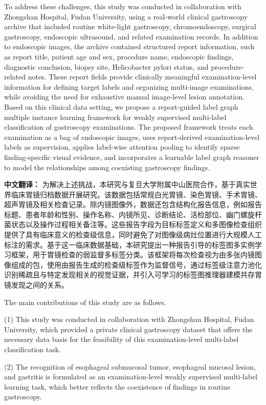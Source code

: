 \documentclass[Afour,sagev,times]{sagej}
\begin{document}
To address these challenges, this study was conducted in collaboration with Zhongshan Hospital, Fudan University, using a real-world clinical gastroscopy archive that included routine white-light gastroscopy, chromoendoscopy, surgical gastroscopy, endoscopic ultrasound, and related examination records. In addition to endoscopic images, the archive contained structured report information, such as report title, patient age and sex, procedure name, endoscopic findings, diagnostic conclusion, biopsy site, Helicobacter pylori status, and procedure-related notes. These report fields provide clinically meaningful examination-level information for defining target labels and organizing multi-image examinations, while avoiding the need for exhaustive manual image-level lesion annotation. Based on this clinical data setting, we propose a report-guided label graph multiple instance learning framework for weakly supervised multi-label classification of gastroscopy examinations. The proposed framework treats each examination as a bag of endoscopic images, uses report-derived examination-level labels as supervision, applies label-wise attention pooling to identify sparse finding-specific visual evidence, and incorporates a learnable label graph reasoner to model the relationships among coexisting gastroscopy findings.

\textbf{中文翻译：} 为解决上述挑战，本研究与复旦大学附属中山医院合作，基于真实世界临床胃镜归档数据开展研究。该数据包括常规白光胃镜、染色胃镜、手术胃镜、超声胃镜及相关检查记录。除内镜图像外，数据还包含结构化报告信息，例如报告标题、患者年龄和性别、操作名称、内镜所见、诊断结论、活检部位、幽门螺旋杆菌状态以及操作过程相关备注等。这些报告字段为目标标签定义和多图像检查组织提供了具有临床意义的检查级信息，同时避免了对图像级病灶位置进行大规模人工标注的需求。基于这一临床数据基础，本研究提出一种报告引导的标签图多实例学习框架，用于胃镜检查的弱监督多标签分类。该框架将每次检查视为由多张内镜图像组成的包，使用由报告生成的检查级标签作为监督信号，通过标签级注意力池化识别稀疏且与特定发现相关的视觉证据，并引入可学习的标签图推理器建模共存胃镜发现之间的关系。

The main contributions of this study are as follows.

(1) This study was conducted in collaboration with Zhongshan Hospital, Fudan University, which provided a private clinical gastroscopy dataset that offers the necessary data basis for the feasibility of this examination-level multi-label classification task.

(2) The recognition of esophageal submucosal tumor, esophageal mucosal lesion, and gastritis is formulated as an examination-level weakly supervised multi-label learning task, which better reflects the coexistence of findings in routine gastroscopy.
\end{document}
